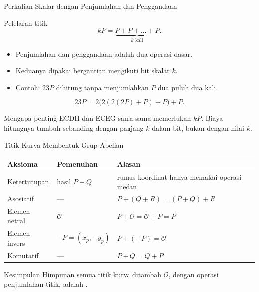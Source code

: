 \documentclass[aspectratio=169,11pt]{beamer}
\begin{document}
\begin{frame}{Perkalian Skalar dengan Penjumlahan dan Penggandaan}
    \begin{block}{Pelelaran titik}
        \[
            kP = \underbrace{P + P + \dots + P}_{k \text{ kali}} .
        \]
    \end{block}
    \vspace{0.05cm}
    \begin{itemize}
        \item Penjumlahan dan penggandaan adalah dua operasi dasar.
        \item Keduanya dipakai bergantian mengikuti bit skalar $k$.
        \item Contoh: $23P$ dihitung tanpa menjumlahkan $P$ dua puluh dua
              kali.
    \end{itemize}
    \[
        23P = 2\bigl(2(2(2P) + P) + P\bigr) + P .
    \]
    \begin{exampleblock}{Mengapa penting}
        \footnotesize
        ECDH dan ECEG sama-sama memerlukan $kP$. Biaya hitungnya tumbuh
        sebanding dengan panjang $k$ dalam bit, bukan dengan nilai $k$.
    \end{exampleblock}
\end{frame}

\begin{frame}{Titik Kurva Membentuk Grup Abelian}
    \footnotesize
    \begin{tabularx}{\linewidth}{@{}l l >{\raggedright\arraybackslash}X@{}}
        \toprule
        \textbf{Aksioma} & \textbf{Pemenuhan} & \textbf{Alasan} \\
        \midrule
        Ketertutupan & hasil $P+Q$ &
        rumus koordinat hanya memakai operasi medan \\
        \addlinespace
        Asosiatif & --- &
        $P+(Q+R) = (P+Q)+R$ \\
        \addlinespace
        Elemen netral & $\mathcal{O}$ &
        $P+\mathcal{O} = \mathcal{O}+P = P$ \\
        \addlinespace
        Elemen invers & $-P=(x_p,-y_p)$ &
        $P+(-P) = \mathcal{O}$ \\
        \addlinespace
        Komutatif & --- &
        $P+Q = Q+P$ \\
        \bottomrule
    \end{tabularx}
    \vspace{0.25cm}
    \begin{exampleblock}{Kesimpulan}
        \footnotesize
        Himpunan semua titik kurva ditambah $\mathcal{O}$, dengan operasi
        penjumlahan titik, adalah .
    \end{exampleblock}
\end{frame}
\end{document}
